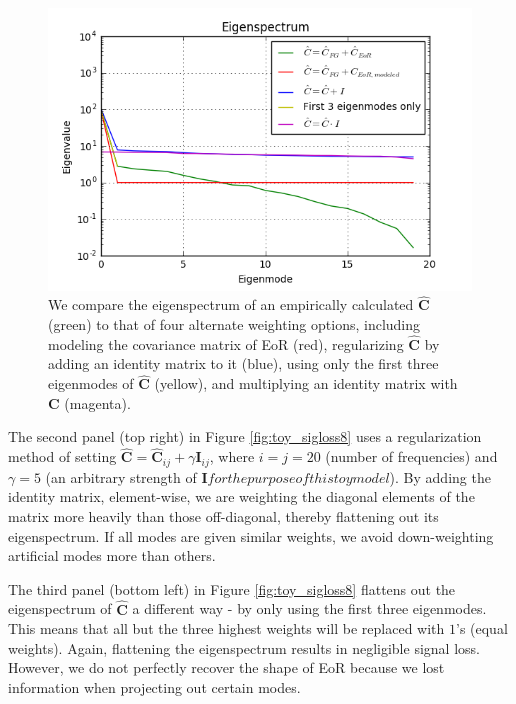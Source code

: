 \documentclass[preprint2,numberedappendix,tighten]{aastex6}  %
\begin{document}
\begin{figure}
	\centering
	\includegraphics[trim={0.3cm 0.3cm 0.3cm 0.3cm},clip,width=\columnwidth]{plots/toy_sigloss14.png}
	\caption{We compare the eigenspectrum of an empirically calculated $\hat{\textbf{C}}$ (green) to that of four alternate weighting options, including modeling the covariance matrix of EoR (red), regularizing $\hat{\textbf{C}}$ by adding an identity matrix to it (blue), using only the first three eigenmodes of $\hat{\textbf{C}}$ (yellow), and multiplying an identity matrix with $\textbf{C}$ (magenta). }
	\label{fig:toy_sigloss14}
\end{figure}

The second panel (top right) in Figure \ref{fig:toy_sigloss8} uses a regularization method of setting $\hat{\textbf{C}} = \hat{\textbf{C}}_{ij} + \gamma\textbf{I}_{ij}$, where $i$$=$$j$$=$$20$ (number of frequencies) and $\gamma = 5$ (an arbitrary strength of $\textbf{I} for the purpose of this toy model$). By adding the identity matrix, element-wise, we are weighting the diagonal elements of the matrix more heavily than those off-diagonal, thereby flattening out its eigenspectrum. If all modes are given similar weights, we avoid down-weighting artificial modes more than others.  

The third panel (bottom left) in Figure \ref{fig:toy_sigloss8} flattens out the eigenspectrum of $\hat{\textbf{C}}$ a different way - by only using the first three eigenmodes. This means that all but the three highest weights will be replaced with $1$'s (equal weights). Again, flattening the eigenspectrum results in negligible signal loss. However, we do not perfectly recover the shape of EoR because we lost information when projecting out certain modes. 
\end{document}
